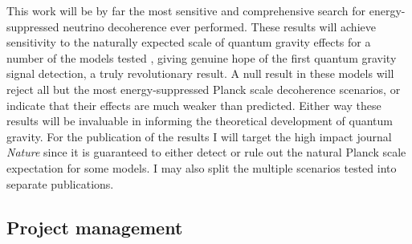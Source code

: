 \documentclass[a4paper,11pt]{article}
\begin{document}

This work will be by far the most sensitive and comprehensive search for energy-suppressed neutrino decoherence ever performed. These results will achieve sensitivity to the naturally expected scale of quantum gravity effects for a number of the models tested , giving genuine hope of the first quantum gravity signal detection, a truly revolutionary result. A null result in these models will reject all but the most energy-suppressed Planck scale decoherence scenarios, or indicate that their effects are much weaker than predicted. Either way these results will be invaluable in informing the theoretical development of quantum gravity. For the publication of the results I will target the high impact journal \textit{Nature} since it is guaranteed to either detect or rule out the natural Planck scale expectation for some models. I may also split the multiple scenarios tested into separate publications. \\


\subsection{Project management}

	


\end{document}
